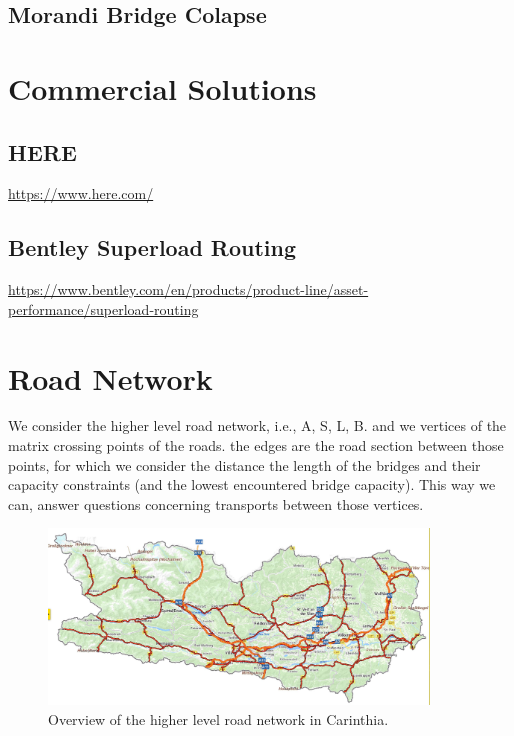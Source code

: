 \subsection{Morandi Bridge Colapse}

\cite{Morgese.2020}
\cite{MorandiNYTimes}


\section{Commercial Solutions}

\subsection{HERE}
\url{https://www.here.com/}

\subsection{Bentley Superload Routing}
\url{https://www.bentley.com/en/products/product-line/asset-performance/superload-routing}



\section{Road Network}

We consider the higher level road network, i.e., A, S, L, B.
and we vertices of the matrix crossing points of the roads.
the edges are the road section between those points, for which we
consider the distance the length of the bridges and their capacity constraints (and the lowest encountered bridge capacity).
This way we can, answer questions concerning transports between those vertices.

\begin{figure}
 \centering
  \includegraphics[width=0.9\textwidth]{map.jpg}
  \caption{Overview of the higher level road network in Carinthia.}
  \label{fig:higher level}
\end{figure}

